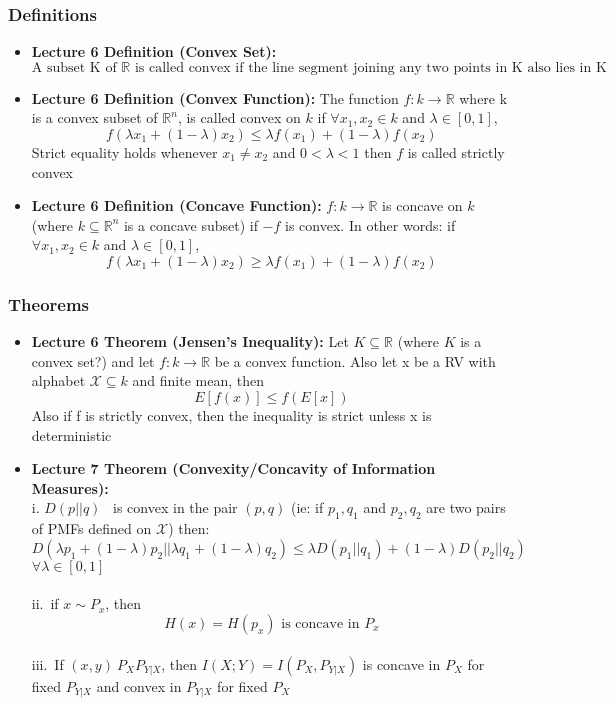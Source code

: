 \documentclass{article}
\begin{document}
\subsubsection{Definitions}
\begin{itemize}
    \item \textbf{Lecture 6 Definition (Convex Set):} \[\text{A subset K of } \mathbb{R} \text{ is called convex if the line segment joining any two points in K also lies in K}\]
    \item \textbf{Lecture 6 Definition (Convex Function):} The function \(f: k \to \mathbb{R}\) where k is a convex subset of \(\mathbb{R}^n\), is called convex on \(k\) if \(\forall x_1,x_2 \in k\) and \(\lambda \in [0,1]\),
    \[f(\lambda x_1 + (1-\lambda)x_2)\leq \lambda f(x_1) + (1-\lambda) f(x_2)\]
    Strict equality holds whenever \(x_1 \neq x_2\) and \(0< \lambda < 1\) then \(f\) is called strictly convex
    \item \textbf{Lecture 6 Definition (Concave Function):} \(f: k \to \mathbb{R}\) is concave on \(k\) (where \( k \subseteq \mathbb{R}^n\) is a concave subset) if \(-f\) is convex. In other words:
    if \(\forall x_1,x_2 \in k\) and \(\lambda \in [0,1]\),
    \[f(\lambda x_1 + (1-\lambda)x_2)\geq \lambda f(x_1) + (1-\lambda) f(x_2)\]

\end{itemize}
\subsubsection{Theorems}
\begin{itemize}
    \item \textbf{Lecture 6 Theorem (Jensen's Inequality):} Let \(K \subseteq \mathbb{R}\) (where \(K\) is a convex set?) and let \(f:k \to \mathbb{R}\) be a convex function. Also let  x be a RV with alphabet \(\mathcal{X} \subseteq k\) and finite mean, then
    \[E[f(x)] \leq f(E[x])\]
    Also if f is strictly convex, then the inequality is strict unless x is deterministic
    \item \textbf{Lecture 7 Theorem (Convexity/Concavity of Information Measures):}
       \\i. \(D(p||q)\) \ is convex in the pair \((p,q)\) (ie: if \(p_1,q_1\) and \(p_2,q_2\) are two pairs of PMFs defined on \(\mathcal{X}\)) then: \\
        \[D(\lambda p_1 + (1-\lambda)p_2 || \lambda q_1 + (1-\lambda) q_2) \leq \lambda D(p_1 || q_1) + (1- \lambda) D(p_2 || q_2)\]
        \(\forall \lambda \in [0,1]\)
        \\
        \\
        ii.\ if \(x \sim  P_x\), then
        \[H(x) = H(p_x) \text{ is concave in } P_x\]
        \\
        iii.\ If \((x,y)~P_X P_{Y|X}\), then \(I(X;Y) = I(P_X, P_{Y|X})\) is concave in \(P_X\) for fixed \(P_{Y|X}\) and convex in \(P_{Y|X}\) for fixed \(P_X\)

\end{itemize}
\end{document}
